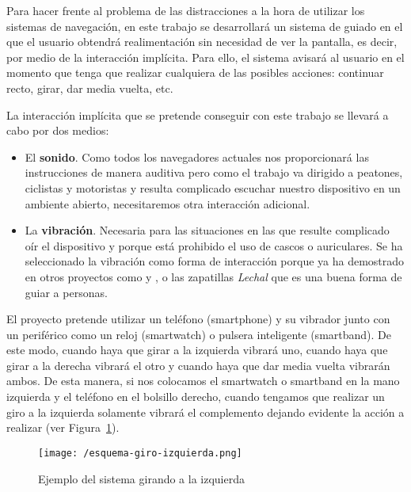 Para hacer frente al problema de las distracciones a la hora de utilizar los sistemas de navegación,
en este trabajo se desarrollará un sistema de guiado en el que el usuario obtendrá realimentación
sin necesidad de ver la pantalla, es decir, por medio de la interacción implícita. Para ello, el
sistema avisará al usuario en el momento que tenga que realizar cualquiera de las posibles acciones:
continuar recto, girar, dar media vuelta, etc.

La  interacción implícita que  se pretende  conseguir con  este trabajo  se llevará  a cabo  por dos
medios:
\begin{itemize}
  \item El \textbf{sonido}. Como todos los navegadores actuales nos proporcionará las instrucciones
    de manera auditiva pero como el trabajo va dirigido a peatones, ciclistas y motoristas y resulta
    complicado escuchar nuestro dispositivo en un ambiente abierto, necesitaremos otra interacción
    adicional.
  \item La \textbf{vibración}. Necesaria para las situaciones en las que resulte complicado oír el
    dispositivo y porque está prohibido el uso de cascos o auriculares. Se ha seleccionado la
    vibración como forma de interacción porque ya ha demostrado en otros proyectos como
    \cite{Boemo12} y \cite{Merino13}, o las zapatillas \textit{Lechal} \cite{Lechal} que es una
    buena forma de guiar a personas.
\end{itemize}

El proyecto pretende utilizar un teléfono (smartphone) y su vibrador junto con un periférico como un
reloj (smartwatch) o pulsera inteligente (smartband). De este modo, cuando haya que girar a la
izquierda vibrará uno, cuando haya que girar a la derecha vibrará el otro y cuando haya que dar
media vuelta vibrarán ambos. De esta manera, si nos colocamos el smartwatch o smartband en la mano
izquierda y el teléfono en el bolsillo derecho, cuando tengamos que realizar un giro a la izquierda
solamente vibrará el complemento dejando evidente la acción a realizar (ver
Figura~\ref{fig:giroIzquierda}).

\begin{figure}[!h]
  \begin{center}
    \texttt{[image: /esquema-giro-izquierda.png]}
    \caption{Ejemplo del sistema girando a la izquierda}
    \label{fig:giroIzquierda}
  \end{center}
\end{figure}


